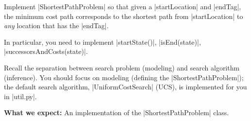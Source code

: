 \item {}

Implement |ShortestPathProblem| so that given a |startLocation| and |endTag|, the minimum cost path corresponds to the shortest path from |startLocation| to \textit{any} location that has the |endTag|.
  
In particular, you need to implement |startState()|, |isEnd(state)|, |successorsAndCosts(state)|.

Recall the separation between search problem (modeling) and search algorithm (inference). You should focus on modeling (defining the |ShortestPathProblem|); the default search algorithm, |UniformCostSearch| (UCS), is implemented for you in |util.py|.

\textbf{What we expect: } An implementation of the |ShortestPathProblem| class.
